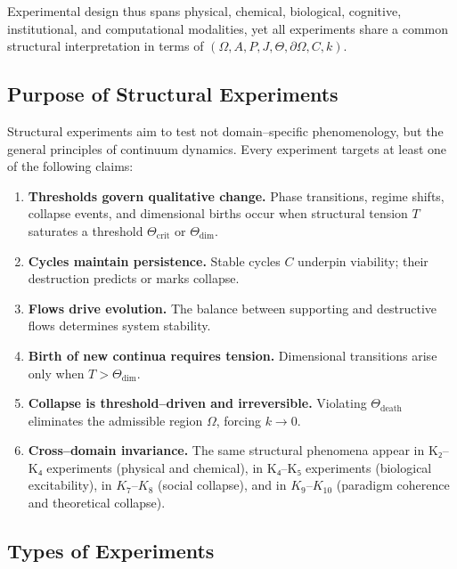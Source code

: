 Experimental design thus spans physical, chemical, biological, cognitive,
institutional, and computational modalities, yet all experiments share a
common structural interpretation in terms of $(\Omega, A, P, J, \Theta,
\partial\Omega, C, k)$.


\subsection{Purpose of Structural Experiments}

Structural experiments aim to test not domain–specific phenomenology, but the
general principles of continuum dynamics.
Every experiment targets at least one of the following claims:

\begin{enumerate}
    \item \textbf{Thresholds govern qualitative change.}
          Phase transitions, regime shifts, collapse events, and dimensional
          births occur when structural tension $T$ saturates a threshold
          $\Theta_{\mathrm{crit}}$ or $\Theta_{\mathrm{dim}}$.

    \item \textbf{Cycles maintain persistence.}
          Stable cycles $C$ underpin viability; their destruction predicts or
          marks collapse.

    \item \textbf{Flows drive evolution.}
          The balance between supporting and destructive flows determines
          system stability.

    \item \textbf{Birth of new continua requires tension.}
          Dimensional transitions arise only when $T > \Theta_{\mathrm{dim}}$.

    \item \textbf{Collapse is threshold–driven and irreversible.}
          Violating $\Theta_{\mathrm{death}}$ eliminates the admissible region
          $\Omega$, forcing $k\to 0$.

    \item \textbf{Cross–domain invariance.}
          The same structural phenomena appear in K₂–K₄ experiments (physical
          and chemical), in K₄–K₅ experiments (biological excitability), in
          $K_7$–$K_8$ (social collapse), and in $K_9$–$K_{10}$ (paradigm coherence and
          theoretical collapse).
\end{enumerate}


\subsection{Types of Experiments}


